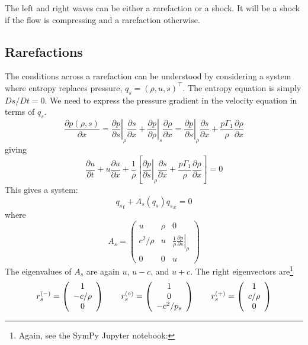 The left and right waves can be either a rarefaction or a shock.  It will
be a shock if the flow is compressing and a rarefaction otherwise.


\subsection{Rarefactions}

The conditions across a rarefaction can be understood by considering
a system where entropy replaces pressure, $q_s = (\rho, u, s)^\intercal$.
The entropy equation is simply $Ds/Dt = 0$.  We need to express the
pressure gradient in the velocity equation in terms of $q_s$.
\begin{equation}
\frac{\partial p(\rho, s)}{\partial x} =
  \left . \frac{\partial p}{\partial s} \right |_\rho \frac{\partial s}{\partial x} +
  \left . \frac{\partial p}{\partial \rho} \right |_s \frac{\partial \rho}{\partial x}
=
  \left . \frac{\partial p}{\partial s} \right |_\rho \frac{\partial s}{\partial x} +
  \frac{p\Gamma_1}{\rho} \frac{\partial \rho}{\partial x}
\end{equation}
giving
\begin{equation}
\frac{\partial u}{\partial t} + u \frac{\partial u}{\partial x} + \frac{1}{\rho} \left [
     \left . \frac{\partial p}{\partial s} \right |_\rho \frac{\partial s}{\partial x} +
          \frac{p\Gamma_1}{\rho} \frac{\partial \rho}{\partial x} \right ] = 0
\end{equation}
This gives a system:
\begin{equation}
{q_s}_t + A_s(q_s) {q_s}_x = 0
\end{equation}
where
\begin{equation}
A_s =
 \left ( \begin{array}{ccc} u & \rho & 0 \\
        c^2/\rho & u & \frac{1}{\rho} \left . \frac{\partial p}{\partial s}\right |_\rho \\
        0 & 0 & u \end{array} \right )
\end{equation}
The eigenvalues of $A_s$ are again $u$, $u-c$, and $u+c$.  The right eigenvectors
are\footnote{Again, see the {\sf SymPy} {\sf Jupyter} notebook:
}
\begin{align}
r_s^\evm = \left ( \begin{array}{c} 1 \\ -c/\rho \\ 0 \end{array} \right )
%
\qquad
r_s^\evz = \left ( \begin{array}{c} 1 \\ 0 \\ -c^2/p_s  \end{array} \right )
%
\qquad
r_s^\evp = \left ( \begin{array}{c} 1 \\ c/\rho \\ 0 \end{array} \right )
\end{align}
